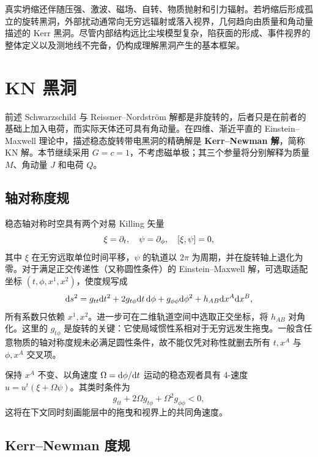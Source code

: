 真实坍缩还伴随压强、激波、磁场、自转、物质抛射和引力辐射。若坍缩后形成孤立的旋转黑洞，外部扰动通常向无穷远辐射或落入视界，几何趋向由质量和角动量描述的 Kerr 黑洞。尽管内部结构远比尘埃模型复杂，陷获面的形成、事件视界的整体定义以及测地线不完备，仍构成理解黑洞产生的基本框架。

\section{KN 黑洞}\label{sec:KN}

前述 Schwarzschild 与 Reissner--Nordstr\"om 解都是非旋转的，后者只是在前者的基础上加入电荷，而实际天体还可具有角动量。在四维、渐近平直的 Einstein--Maxwell 理论中，描述稳态旋转带电黑洞的精确解是 \textbf{Kerr--Newman 解}，简称 KN 解。本节继续采用 $G=c=1$，不考虑磁单极；其三个参量将分别解释为质量 $M$、角动量 $J$ 和电荷 $Q$。

\subsection{轴对称度规}

稳态轴对称时空具有两个对易 Killing 矢量
\[
    \xi=\partial_t,\quad \psi=\partial_\phi,
    \quad [\xi,\psi]=0,
\]
其中 $\xi$ 在无穷远取单位时间平移，$\psi$ 的轨道以 $2\pi$ 为周期，并在旋转轴上退化为零。对于满足正交传递性（又称圆性条件）的 Einstein--Maxwell 解，可选取适配坐标 $(t,\phi,x^1,x^2)$，使度规写成
\[
    \dd s^2=g_{tt}\dd t^2+2g_{t\phi}\dd t\,\dd\phi+g_{\phi\phi}\dd\phi^2
    +h_{AB}\dd x^A\dd x^B,
\]
所有系数只依赖 $x^1,x^2$。进一步可在二维轨道空间中选取正交坐标，将 $h_{AB}$ 对角化。这里的 $g_{t\phi}$ 是旋转的关键：它使局域惯性系相对于无穷远发生拖曳。一般含任意物质的轴对称度规未必满足圆性条件，故不能仅凭对称性就删去所有 $t,x^A$ 与 $\phi,x^A$ 交叉项。

保持 $x^A$ 不变、以角速度 $\Omega=\dd\phi/\dd t$ 运动的稳态观者具有 4-速度 $u=u^t(\xi+\Omega\psi)$。其类时条件为
\[
    g_{tt}+2\Omega g_{t\phi}+\Omega^2g_{\phi\phi}<0,
\]
这将在下文同时刻画能层中的拖曳和视界上的共同角速度。

\subsection{Kerr--Newman 度规}


